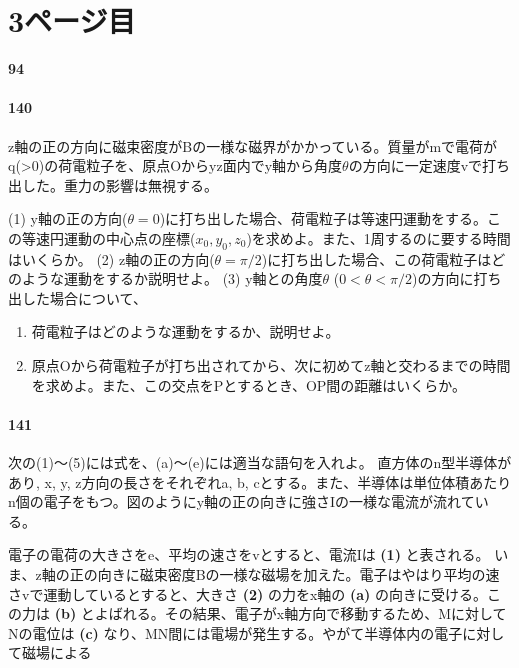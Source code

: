 \documentclass[a4paper, 10pt, dvipdfmx]{bxjsarticle}
\begin{document}
\section*{3ページ目}

\noindent
\textbf{94}

\paragraph{140} z軸の正の方向に磁束密度がBの一様な磁界がかかっている。質量がmで電荷がq(>0)の荷電粒子を、原点Oからyz面内でy軸から角度$\theta$の方向に一定速度vで打ち出した。重力の影響は無視する。
\begin{center}
\end{center}
(1) y軸の正の方向($\theta=0$)に打ち出した場合、荷電粒子は等速円運動をする。この等速円運動の中心点の座標($x_0, y_0, z_0$)を求めよ。また、1周するのに要する時間はいくらか。
(2) z軸の正の方向($\theta=\pi/2$)に打ち出した場合、この荷電粒子はどのような運動をするか説明せよ。
(3) y軸との角度$\theta$ ($0<\theta<\pi/2$)の方向に打ち出した場合について、
\begin{enumerate}[label=(\alph*)]
    \item 荷電粒子はどのような運動をするか、説明せよ。
    \item 原点Oから荷電粒子が打ち出されてから、次に初めてz軸と交わるまでの時間を求めよ。また、この交点をPとするとき、OP間の距離はいくらか。
\end{enumerate}

\paragraph{141} 次の(1)～(5)には式を、(a)～(e)には適当な語句を入れよ。
直方体のn型半導体があり, x, y, z方向の長さをそれぞれa, b, cとする。また、半導体は単位体積あたりn個の電子をもつ。図のようにy軸の正の向きに強さIの一様な電流が流れている。
\begin{center}
\end{center}
電子の電荷の大きさをe、平均の速さをvとすると、電流Iは \textbf{(1)} と表される。
いま、z軸の正の向きに磁束密度Bの一様な磁場を加えた。電子はやはり平均の速さvで運動しているとすると、大きさ \textbf{(2)} の力をx軸の \textbf{(a)} の向きに受ける。この力は \textbf{(b)} とよばれる。その結果、電子がx軸方向で移動するため、Mに対してNの電位は \textbf{(c)} なり、MN間には電場が発生する。やがて半導体内の電子に対して磁場による
\end{document}
